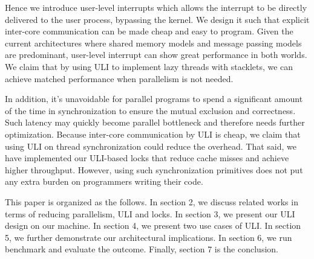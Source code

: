 Hence we introduce user-level interrupts which allows the interrupt to be directly delivered to the user process, bypassing the kernel. We design it such that explicit inter-core communication can be made cheap and easy to program. Given the current architectures where shared memory models and message passing models are predominant, user-level interrupt can show great performance in both worlds. We claim that by using ULI to implement lazy threads with stacklets, we can achieve matched performance when parallelism is not needed.

In addition, it's unavoidable for parallel programs to spend a significant amount of the time in synchronization to ensure the mutual exclusion and correctness. Such latency may quickly become parallel bottleneck and therefore needs further optimization. Because inter-core communication by ULI is cheap, we claim that using ULI on thread synchronization could reduce the overhead. That said, we have implemented our ULI-based locks that reduce cache misses and achieve higher throughput. However, using such synchronization primitives does not put any extra burden on programmers writing their code.

This paper is organized as the follows. In section 2, we discuss related works in terms of reducing parallelism, ULI and locks. In section 3, we present our ULI design on our machine. In section 4, we present two use cases of ULI. In section 5, we further demonstrate our architectural implications. In section 6, we run benchmark and evaluate the outcome. Finally, section 7 is the conclusion.
\lipsum

